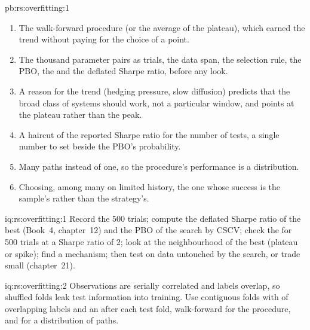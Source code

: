 \begin{solution}{pb:rs:overfitting:1}
\begin{enumerate}
the average system's 0.20 and 0.26 in each world, while annual walk-forward re-selection earns $-0.04$ and 0.29. The deflated expectation of the winner is the
average system's, not its own  0.44 or 0.77.
\item The walk-forward procedure (or the average of the plateau), which earned the trend without paying for the choice of a point.
\item The thousand parameter pairs as trials, the data span, the selection rule, the PBO, the  and the deflated Sharpe ratio, before any
 look.
\item A reason for the trend (hedging pressure, slow diffusion) predicts that the broad class of systems should work, not a particular window, and points at the
plateau rather than the peak.
\item A haircut of the reported Sharpe ratio for the number of tests, a single number to set beside the PBO's probability.
\item Many  paths instead of one, so the procedure's performance is a distribution.
\item Choosing, among many  on limited history, the one whose success is the sample's rather than the strategy's.
\end{enumerate}
\end{solution}

\begin{solution}{iq:rs:overfitting:1}
Record the 500 trials; compute the deflated Sharpe ratio of the best (Book~4, chapter~12) and the PBO of the search by CSCV; check the  for
500 trials at a Sharpe ratio of 2; look at the neighbourhood of the best (plateau or spike); find a mechanism; then test on data untouched by the search, or trade
small (chapter~21).
\end{solution}

\begin{solution}{iq:rs:overfitting:2}
Observations are serially correlated and labels overlap, so shuffled folds leak test information into training. Use contiguous folds with  of overlapping
labels and an  after each test fold, walk-forward for the procedure, and  for a distribution of paths.
\end{solution}

